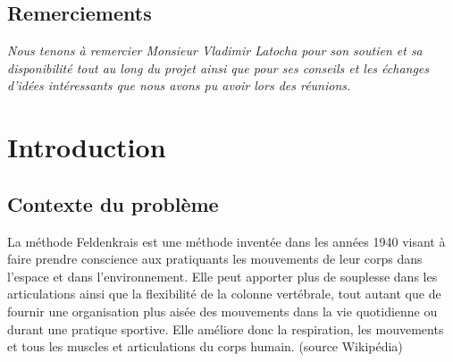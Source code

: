 \documentclass[pidr]{tnreport}
\begin{document}
\maketitle
{}


\cleardoublepage

\makesecondtitle

\section*{Remerciements}




{\em
Nous tenons à remercier Monsieur Vladimir Latocha pour son soutien et sa disponibilité tout au long du projet ainsi que pour ses conseils et les échanges d’idées intéressants que nous avons pu avoir lors des réunions.
}





\cleardoublepage

\tableofcontents

\renewcommand{\baselinestretch}{1.0}\normalsize
\cleardoublepage

\setcounter{page}{1}

\chapter{Introduction}

\section{Contexte du problème}

La méthode Feldenkrais est une méthode inventée dans les années 1940 visant à faire prendre conscience aux pratiquants les mouvements de leur corps dans l’espace et dans l’environnement. Elle peut apporter plus de souplesse dans les articulations ainsi que la flexibilité de la colonne vertébrale, tout autant que de fournir une organisation plus aisée des mouvements dans la vie quotidienne ou durant une pratique sportive. Elle améliore donc la respiration, les mouvements et tous les muscles et articulations du corps humain. (source Wikipédia)
\end{document}
